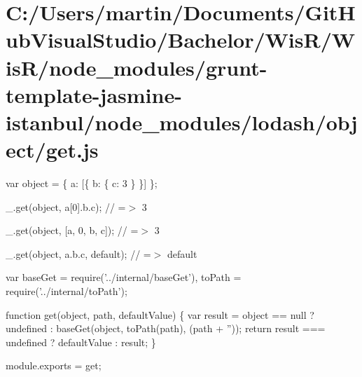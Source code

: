 \hypertarget{_c_1_2_users_2martin_2_documents_2_git_hub_visual_studio_2_bachelor_2_wis_r_2_wis_r_2node_module41ed309dcf1e6170a580b88d676e2f00}{}\section{C\+:/\+Users/martin/\+Documents/\+Git\+Hub\+Visual\+Studio/\+Bachelor/\+Wis\+R/\+Wis\+R/node\+\_\+modules/grunt-\/template-\/jasmine-\/istanbul/node\+\_\+modules/lodash/object/get.\+js}
var object = \{ \textquotesingle{}a\textquotesingle{}\+: \mbox{[}\{ \textquotesingle{}b\textquotesingle{}\+: \{ \textquotesingle{}c\textquotesingle{}\+: 3 \} \}\mbox{]} \};

\+\_\+.\+get(object, \textquotesingle{}a\mbox{[}0\mbox{]}.b.\+c\textquotesingle{}); // =$>$ 3

\+\_\+.\+get(object, \mbox{[}\textquotesingle{}a\textquotesingle{}, \textquotesingle{}0\textquotesingle{}, \textquotesingle{}b\textquotesingle{}, \textquotesingle{}c\textquotesingle{}\mbox{]}); // =$>$ 3

\+\_\+.\+get(object, \textquotesingle{}a.\+b.\+c\textquotesingle{}, \textquotesingle{}default\textquotesingle{}); // =$>$ \textquotesingle{}default\textquotesingle{}


\begin{DoxyCodeInclude}
var baseGet = require(\textcolor{stringliteral}{'../internal/baseGet'}),
    toPath = require(\textcolor{stringliteral}{'../internal/toPath'});

\textcolor{keyword}{function} \textcolor{keyword}{get}(object, path, defaultValue) \{
  var result = \textcolor{keywordtype}{object} == null ? undefined : baseGet(\textcolor{keywordtype}{object}, toPath(path), (path + \textcolor{stringliteral}{''}));
  \textcolor{keywordflow}{return} result === undefined ? defaultValue : result;
\}

module.exports = \textcolor{keyword}{get};
\end{DoxyCodeInclude}
 
